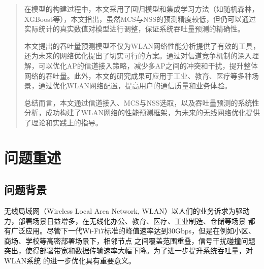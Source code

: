 \documentclass[bwprint]{gmcmthesis}
\begin{document}
\begin{abstract}
   在模型的构建过程中，本文采用了回归模型和集成学习方法（如随机森林，XGBoost等），本文指出，虽然MCS与NSS的预测精度较低，但仍可以通过实际统计的真实数值对模型进行调整，保证系统吞吐量预测的精确性。
   
   本文提出的吞吐量预测模型不仅为WLAN网络性能分析提供了有效的工具，还为未来的网络优化提出了切实可行的方案。通过对信道竞争机制的深入理解，可以优化AP的信道接入策略，减少多AP之间的冲突和干扰，提升整体网络的吞吐量。此外，本文的研究成果可应用于工业、教育、医疗等多种场景，通过优化WLAN网络配置，提高用户的通信质量和业务体验。
   
   总结而言，本文通过信道接入、MCS与NSS选取，以及吞吐量预测的系统性分析，成功构建了WLAN网络的性能预测框架，为未来的无线网络优化提供了理论和实践上的指导。




\end{abstract}

\pagestyle{plain}








\newpage
\section{问题重述}
\subsection{问题背景}
 无线局域网（Wireless Local Area Network, WLAN）以人们的业务诉求为驱动力，部署场景日益增多，在无线化办公、教育、医疗、工业制造、仓储等场景
 都有广泛应用。尽管下一代Wi-Fi7标准的峰值速率达到30Gbps，但是在例如小区、商场、学校等高密部署场景下，相邻节点
 之间覆盖范围重叠，信号干扰碰撞问题突出，使得部署带宽和数据传输速率大幅下降。为了进一步提升系统吞吐量，对WLAN系统
 的进一步优化具有重要意义。
\end{document}
